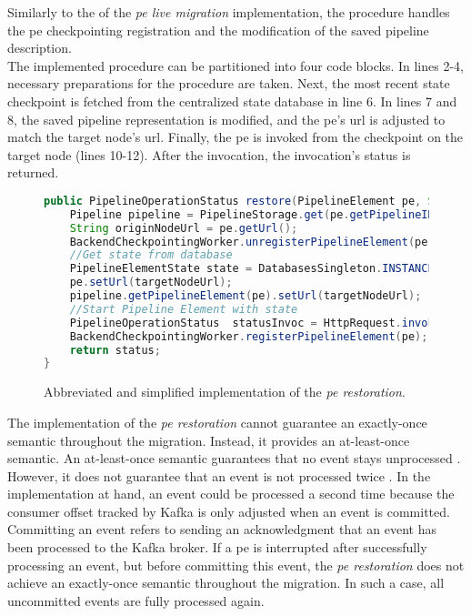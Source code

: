 Similarly to the of the \textit{\acrshort{pe} live migration} implementation, the procedure handles the \gls{pe} checkpointing registration and the modification of the saved pipeline description.\\
The implemented procedure can be partitioned into four code blocks. In lines 2-4, necessary preparations for the procedure are taken. Next, the most recent state checkpoint is fetched from the centralized state database in line 6. In lines 7 and 8, the saved pipeline representation is modified, and the \gls{pe}'s \gls{url} is adjusted to match the target node's \gls{url}. Finally, the \gls{pe} is invoked from the checkpoint on the target node (lines 10-12). After the invocation, the invocation's status is returned.\\

\begin{figure}[H]
    \begin{lstlisting}[language=Java]
public PipelineOperationStatus restore(PipelineElement pe, String targetNodeUrl){
    Pipeline pipeline = PipelineStorage.get(pe.getPipelineID());
    String originNodeUrl = pe.getUrl();
    BackendCheckpointingWorker.unregisterPipelineElement(pe.ID)
    //Get state from database
    PipelineElementState state = DatabasesSingleton.INSTANCE.getDatabase(pe.ID).getLast();
    pe.setUrl(targetNodeUrl);
    pipeline.getPipelineElement(pe).setUrl(targetNodeUrl);
    //Start Pipeline Element with state
    PipelineOperationStatus  statusInvoc = HttpRequest.invoke(pe, state);
    BackendCheckpointingWorker.registerPipelineElement(pe);
    return status;
}
    \end{lstlisting}
    \caption{Abbreviated and simplified implementation of the \textit{\acrshort{pe} restoration}.}
    \label{fOSRImplementation}
\end{figure}


The implementation of the \textit{\acrshort{pe} restoration} cannot guarantee an exactly-once semantic throughout the migration. Instead, it provides an at-least-once semantic. An at-least-once semantic guarantees that no event stays unprocessed \cite{Huang.2001}. However, it does not guarantee that an event is not processed twice \cite{Huang.2001}. In the implementation at hand, an event could be processed a second time because the consumer offset tracked by Kafka is only adjusted when an event is committed. Committing an event refers to sending an acknowledgment that an event has been processed to the Kafka broker. If a \gls{pe} is interrupted after successfully processing an event, but before committing this event, the \textit{\acrshort{pe} restoration} does not achieve an exactly-once semantic throughout the migration. In such a case, all uncommitted events are fully processed again.\par
